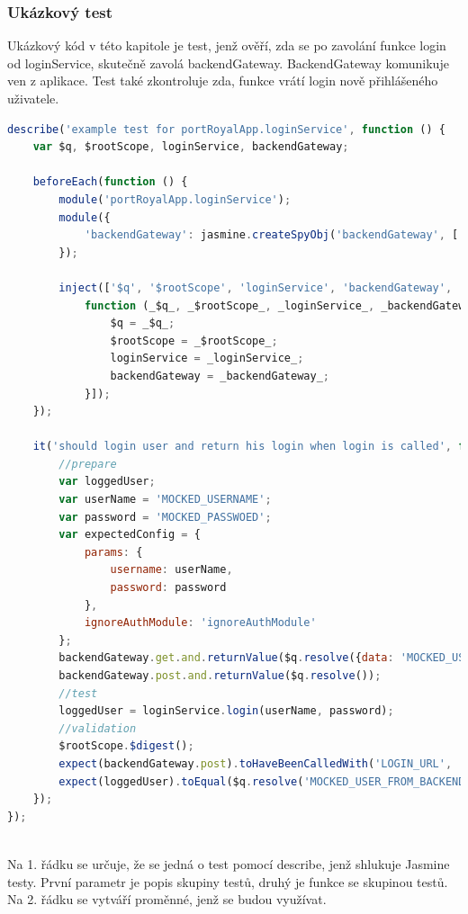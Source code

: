 \documentclass[czech,master,public,dept460,male,cpdeclaration,twoside]{diploma}
\begin{document}
\subsubsection{Ukázkový test}
Ukázkový kód v této kapitole je test, jenž ověří, zda se po zavolání funkce login od loginService, skutečně zavolá backendGateway. BackendGateway komunikuje ven z aplikace. Test také zkontroluje zda, funkce vrátí login nově přihlášeného uživatele.
\\
\begin{lstlisting}[language=JavaScript, caption=Ukázka testu pomocí Jasmine]
describe('example test for portRoyalApp.loginService', function () {
    var $q, $rootScope, loginService, backendGateway;

    beforeEach(function () {
        module('portRoyalApp.loginService');
        module({
            'backendGateway': jasmine.createSpyObj('backendGateway', ['get', 'post'])
        });

        inject(['$q', '$rootScope', 'loginService', 'backendGateway',
            function (_$q_, _$rootScope_, _loginService_, _backendGateway_) {
                $q = _$q_;
                $rootScope = _$rootScope_;
                loginService = _loginService_;
                backendGateway = _backendGateway_;
            }]);
    });

    it('should login user and return his login when login is called', function () {
        //prepare
        var loggedUser;
        var userName = 'MOCKED_USERNAME';
        var password = 'MOCKED_PASSWOED';
        var expectedConfig = {
            params: {
                username: userName,
                password: password
            },
            ignoreAuthModule: 'ignoreAuthModule'
        };
        backendGateway.get.and.returnValue($q.resolve({data: 'MOCKED_USER_FROM_BACKEND'}));
        backendGateway.post.and.returnValue($q.resolve());
        //test
        loggedUser = loginService.login(userName, password);
        //validation
        $rootScope.$digest();
        expect(backendGateway.post).toHaveBeenCalledWith('LOGIN_URL', '', expectedConfig, false, true);
        expect(loggedUser).toEqual($q.resolve('MOCKED_USER_FROM_BACKEND'));
    });
});
\end{lstlisting}
~\\
Na 1. řádku se určuje, že se jedná o test pomocí describe, jenž shlukuje Jasmine testy. První parametr je popis skupiny testů, druhý je funkce se skupinou testů.\\
Na 2. řádku se vytváří proměnné, jenž se budou využívat.\\
\end{document}
